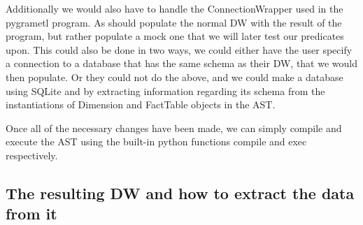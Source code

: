 Additionally we would also have to handle the ConnectionWrapper used in the pygrametl program. As should populate the normal DW with the result of the program, but rather populate a mock one that we will later test our predicates upon. This could also be done in two ways, we could either have the user specify a connection to a database that has the same schema as their DW, that we would then populate. Or they could not do the above, and we could make a database using SQLite and by extracting information regarding its schema from the instantiations of Dimension and FactTable objects in the AST.

Once all of the necessary changes have been made, we can simply compile and execute the AST using the built-in python functions compile and exec respectively.

\subsection{The resulting DW and how to extract the data from it}
